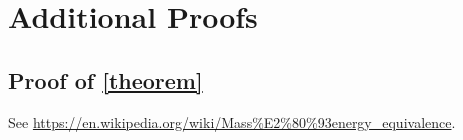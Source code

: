 \section{Additional Proofs}
\subsection{Proof of \autoref{theorem}}\label{appendix}
See \url{https://en.wikipedia.org/wiki/Mass%E2%80%93energy_equivalence}.